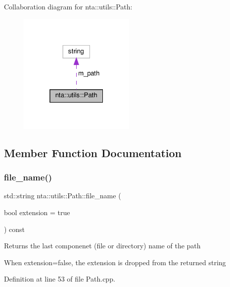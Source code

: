 Collaboration diagram for nta\+:\+:utils\+:\+:Path\+:\nopagebreak
\begin{figure}[H]
\begin{center}
\leavevmode
\includegraphics[width=160pt]{d4/d5a/classnta_1_1utils_1_1Path__coll__graph}
\end{center}
\end{figure}


\subsection{Member Function Documentation}
\mbox{\label{classnta_1_1utils_1_1Path_a7913426e42b3ac300554ae7adb740a0a}} 
\subsubsection{\texorpdfstring{file\+\_\+name()}{file\_name()}}
{\footnotesize\ttfamily std\+::string nta\+::utils\+::\+Path\+::file\+\_\+name (\begin{DoxyParamCaption}\item[{bool}]{extension = {\ttfamily true} }\end{DoxyParamCaption}) const}

Returns the last componenet (file or directory) name of the path

When extension=false, the extension is dropped from the returned string 

Definition at line 53 of file Path.\+cpp.

